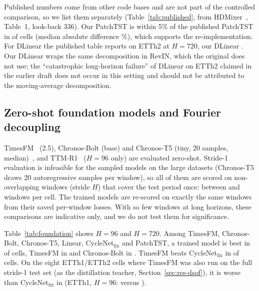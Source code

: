 \documentclass[11pt,a4paper]{article}
\begin{document}
Published numbers come from other code bases and are not part of the controlled comparison, so we list them separately (Table~\ref{tab:published}, from HDMixer~\cite{hdmixer2024}, Table~1, look-back 336). Our PatchTST is within 5\% of the published PatchTST in \vPubPatchWithinFive{} of \vPubCells{} cells (median absolute difference \vPubPatchMedAbs\%), which supports the re-implementation. For DLinear the published table reports \vPubDlinETThTwo{} on ETTh2 at $H=720$, our DLinear \vOurDlinETThTwo. Our DLinear wraps the same decomposition in RevIN, which the original does not use; the ``catastrophic long-horizon failure'' of DLinear on ETTh2 claimed in the earlier draft does not occur in this setting and should not be attributed to the moving-average decomposition.

\begin{table}[t]
\centering
\scriptsize
\setlength{\tabcolsep}{3pt}

\caption{\textbf{Published reference numbers} (MSE) as reported in HDMixer~\cite{hdmixer2024}, Table~1 (look-back 336), next to our controlled re-runs. Different code, training recipes and evaluation details: for context only. HDMixer is not re-implemented. Solar is not reported there.}
\label{tab:published}
\end{table}

\subsection{Zero-shot foundation models and Fourier decoupling}
\label{sec:res-foundation}
TimesFM~\cite{das2024timesfm} (2.5), Chronos-Bolt (base) and Chronos-T5 (tiny, 20 samples, median)~\cite{ansari2024chronos}, and TTM-R1~\cite{ekambaram2024ttm} ($H=96$ only) are evaluated zero-shot. Stride-1 evaluation is infeasible for the sampled models on the large datasets (Chronos-T5 draws 20 autoregressive samples per window), so all of them are scored on non-overlapping windows (stride $H$) that cover the test period once: between \vFoundMinWindows{} and \vFoundMaxWindows{} windows per cell. The trained models are re-scored on exactly the same windows from their saved per-window losses. With so few windows at long horizons, these comparisons are indicative only, and we do not test them for significance.

Table~\ref{tab:foundation} shows $H=96$ and $H=720$. Among TimesFM, Chronos-Bolt, Chronos-T5, Linear, CycleNet$_{\text{fix}}$ and PatchTST, a trained model is best in \vFoundTrainedBest{} of \vFoundCells{} cells, TimesFM in \vFoundTimesfmBest{} and Chronos-Bolt in \vFoundBoltBest. TimesFM beats CycleNet$_{\text{fix}}$ in \vFoundTfmBeatsFixed{} of \vFoundCells{} cells. On the eight ETTh1/ETTh2 cells where TimesFM was also run on the full stride-1 test set (as the distillation teacher, Section~\ref{sec:res-dsof}), it is worse than CycleNet$_{\text{fix}}$ in \vTeacherWorseThanFixed{} (ETTh1, $H=96$: \vTeacherETThOneNinetySix{} versus \vFixedETThOneNinetySix).
\end{document}
